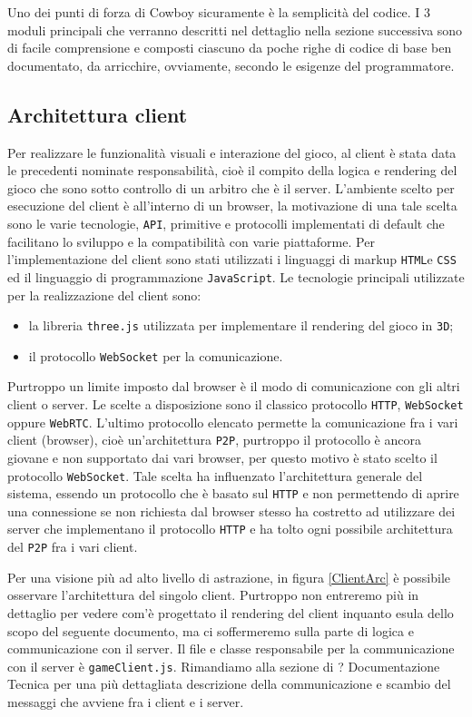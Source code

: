 \documentclass[paper=a4, fontsize=11pt]{scrartcl} %
\numberwithin{equation}{section} %
\numberwithin{figure}{section} %
\numberwithin{table}{section} %
\begin{document}
Uno dei punti di forza di Cowboy sicuramente è la semplicità del codice. I 3 moduli principali che verranno descritti nel dettaglio nella sezione successiva sono di facile comprensione e composti ciascuno da poche righe di codice di base ben documentato, da arricchire, ovviamente, secondo le esigenze del programmatore.

\subsection{Architettura client}
Per realizzare le funzionalità visuali e interazione del gioco, al client è stata data le precedenti nominate responsabilità, cioè il compito della logica e rendering del gioco che sono sotto controllo di un arbitro che è il server.
L'ambiente scelto per esecuzione del client è all'interno di un browser, la motivazione di una tale scelta sono le varie tecnologie, \texttt{API}, primitive e protocolli
implementati di default che facilitano lo sviluppo e la compatibilità con varie piattaforme.
Per l'implementazione del client sono stati utilizzati i linguaggi di markup \texttt{HTML}e \texttt{CSS} ed il linguaggio di programmazione \texttt{JavaScript}.
Le tecnologie principali utilizzate per la realizzazione del client sono:
\begin{itemize}
\item la libreria \texttt{three.js} \cite{threejs} utilizzata per implementare il rendering del gioco in \texttt{3D};
\item il protocollo \texttt{WebSocket} \cite{websocket} per la comunicazione.
\end{itemize}

Purtroppo un limite imposto dal browser è il modo di comunicazione con gli altri client o server. Le scelte a disposizione sono il classico protocollo \texttt{HTTP}, \texttt{WebSocket} oppure \texttt{WebRTC}. L'ultimo protocollo elencato permette la comunicazione fra i vari client (browser), cioè un'architettura \texttt{P2P}, purtroppo il
protocollo è ancora giovane e non supportato dai vari browser, per questo motivo è stato scelto il protocollo \texttt{WebSocket}. Tale scelta ha influenzato l'architettura
generale del sistema, essendo un protocollo che è basato sul \texttt{HTTP} e non permettendo di aprire una connessione se non richiesta dal browser stesso ha costretto
ad utilizzare dei server che implementano il protocollo \texttt{HTTP} e ha tolto ogni possibile architettura del \texttt{P2P} fra i vari client.


Per una visione più ad alto livello di astrazione, in figura \ref{ClientArc} è possibile osservare l'architettura del singolo client.
Purtroppo non entreremo più in dettaglio per vedere com'è progettato il rendering del client inquanto esula dello scopo del seguente documento, 
ma ci soffermeremo sulla parte di logica e communicazione con il server. Il file e classe responsabile per la communicazione con il server è \texttt{gameClient.js}.
Rimandiamo alla sezione di ? Documentazione Tecnica per una più dettagliata descrizione della communicazione e scambio del messaggi che avviene fra i client e i server.
\end{document}
